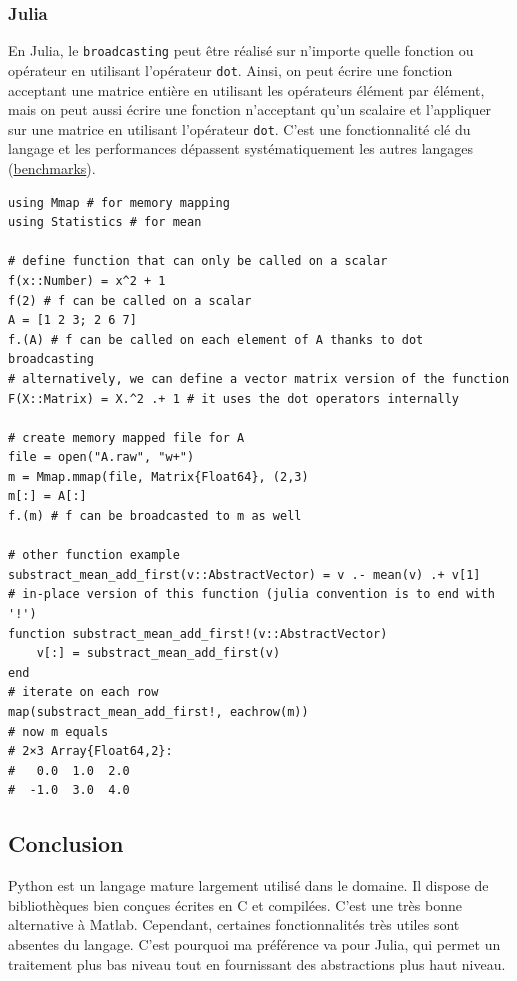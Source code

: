 \subsubsection{Julia}

En Julia, le \verb|broadcasting| peut être réalisé sur n'importe quelle fonction ou opérateur en utilisant l'opérateur \verb|dot|. Ainsi, on peut écrire une fonction acceptant une matrice entière en utilisant les opérateurs élément par élément, mais on peut aussi écrire une fonction n'acceptant qu'un scalaire et l'appliquer sur une matrice en utilisant l'opérateur \verb|dot|. C'est une fonctionnalité clé du langage et les performances dépassent systématiquement les autres langages (\href{https://julialang.org/benchmarks/}{benchmarks}).

\juliastyle
\begin{lstlisting}
using Mmap # for memory mapping
using Statistics # for mean

# define function that can only be called on a scalar
f(x::Number) = x^2 + 1
f(2) # f can be called on a scalar
A = [1 2 3; 2 6 7]
f.(A) # f can be called on each element of A thanks to dot broadcasting
# alternatively, we can define a vector matrix version of the function
F(X::Matrix) = X.^2 .+ 1 # it uses the dot operators internally

# create memory mapped file for A
file = open("A.raw", "w+")
m = Mmap.mmap(file, Matrix{Float64}, (2,3)
m[:] = A[:]
f.(m) # f can be broadcasted to m as well

# other function example
substract_mean_add_first(v::AbstractVector) = v .- mean(v) .+ v[1]
# in-place version of this function (julia convention is to end with '!')
function substract_mean_add_first!(v::AbstractVector)
	v[:] = substract_mean_add_first(v)
end
# iterate on each row
map(substract_mean_add_first!, eachrow(m))
# now m equals
# 2×3 Array{Float64,2}:
#   0.0  1.0  2.0
#  -1.0  3.0  4.0
\end{lstlisting}


\subsection{Conclusion}

Python est un langage mature largement utilisé dans le domaine. Il dispose de bibliothèques bien conçues écrites en C et compilées. C'est une très bonne alternative à Matlab. Cependant, certaines fonctionnalités très utiles sont absentes du langage. C'est pourquoi ma préférence va pour Julia, qui permet un traitement plus bas niveau tout en fournissant des abstractions plus haut niveau.




